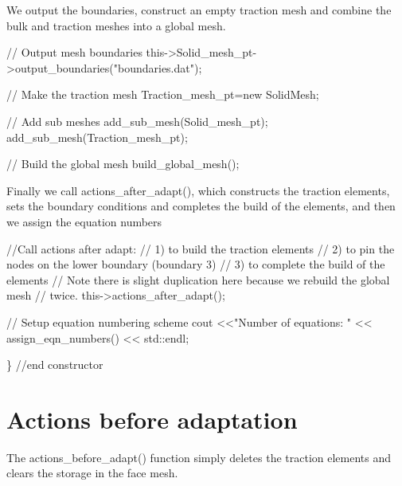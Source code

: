 We output the boundaries, construct an empty traction mesh and combine the bulk and traction meshes into a global mesh.


\begin{DoxyCodeInclude}
   
 \textcolor{comment}{// Output mesh boundaries}
 this->Solid\_mesh\_pt->output\_boundaries(\textcolor{stringliteral}{"boundaries.dat"});

 \textcolor{comment}{// Make the traction mesh}
 Traction\_mesh\_pt=\textcolor{keyword}{new} SolidMesh;
 
 \textcolor{comment}{// Add sub meshes}
 add\_sub\_mesh(Solid\_mesh\_pt);
 add\_sub\_mesh(Traction\_mesh\_pt);
 
 \textcolor{comment}{// Build the global mesh}
 build\_global\_mesh();

\end{DoxyCodeInclude}


Finally we call {\ttfamily actions\+\_\+after\+\_\+adapt()}, which constructs the traction elements, sets the boundary conditions and completes the build of the elements, and then we assign the equation numbers


\begin{DoxyCodeInclude}

 \textcolor{comment}{//Call actions after adapt:}
 \textcolor{comment}{// 1) to build the traction elements}
 \textcolor{comment}{// 2) to pin the nodes on the lower boundary (boundary 3)}
 \textcolor{comment}{// 3) to complete the build of the elements}
 \textcolor{comment}{// Note there is slight duplication here because we rebuild the global mesh}
 \textcolor{comment}{// twice.}
 this->actions\_after\_adapt();
   
 \textcolor{comment}{// Setup equation numbering scheme}
 cout <<\textcolor{stringliteral}{"Number of equations: "} << assign\_eqn\_numbers() << std::endl; 
 
\} \textcolor{comment}{//end constructor}

\end{DoxyCodeInclude}




 

\hypertarget{index_adapt_after}{}\section{Actions before adaptation}\label{index_adapt_after}
The {\ttfamily actions\+\_\+before\+\_\+adapt()} function simply deletes the traction elements and clears the storage in the face mesh.


